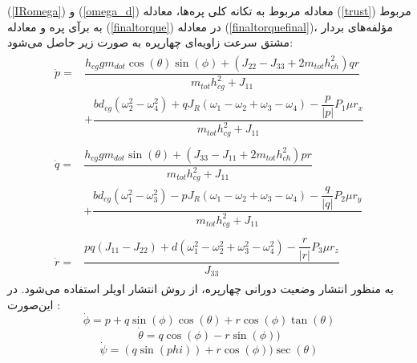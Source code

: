  (\ref{IRomega}) و
 (\ref{omega_d})
 معادله مربوط به تکانه کلی پره‌ها، 
 معادله
 (\ref{trust})
مربوط به برآی پره و معادله 
(\ref{finaltorque})
در معادله 
(\ref{finaltorquefinal})،
مؤلفه‌های بردار مشتق سرعت زاویه‌ای چهارپره به صورت زیر حاصل می‌شود:
\begin{align}
	\begin{split}\label{p dot}
		\dot{p} =& \dfrac{h_{cg}gm_{dot}\cos(\theta)\sin(\phi)
			+\left(J_{22} - J_{33} +2m_{tot}h_{ch}^2\right)qr
		}
		{m_{tot}h_{cg}^2 + J_{11}} \\
		&+\dfrac{bd_{cg}\left(\omega_2^2-\omega_4^2\right) + qJ_R(\omega_1-\omega_2+\omega_3-\omega_4) - \dfrac{p}{\lvert p \rvert}P_1\mu r_x}
		{m_{tot}h_{cg}^2 + J_{11}}
	\end{split}\\[1em]
		\begin{split}
		\dot{q} =& \dfrac{h_{cg}gm_{dot}\sin(\theta)
			+\left(J_{33} - J_{11} +2m_{tot}h_{ch}^2\right)pr
		}
		{m_{tot}h_{cg}^2 + J_{11}} \\
		&+\dfrac{bd_{cg}\left(\omega_1^2-\omega_3^2\right) - pJ_R(\omega_1-\omega_2+\omega_3-\omega_4)- \dfrac{q}{\lvert q \rvert}P_2\mu r_y}
		{m_{tot}h_{cg}^2 + J_{11}}
	\end{split}\\[1em]
	\begin{split}
		\dot{r} =& \dfrac{pq(J_{11}-J_{22})
		+ d(\omega_1^2-\omega_2^2+\omega_3^2-\omega_4^2) - \dfrac{r}{\lvert r \rvert}P_3\mu r_z
	}{J_{33}}
	\end{split}
\end{align}
به منظور انتشار وضعیت دورانی چهارپره، از روش انتشار اویلر استفاده می‌شود. در این‌صورت
\cite{zipfel2000modeling}
:
\begin{equation}
	\dot\phi = p + q\sin(\phi)\cos(\theta) +‌
	r\cos(\phi)\tan(\theta)
\end{equation}
\begin{equation}
\dot \theta = q\cos(\phi) - r\sin(\phi))
\end{equation}
\begin{equation}\label{psidot}
	\dot\psi = (q\sin(phi)) + r\cos(\phi))\sec(\theta) 
\end{equation}


